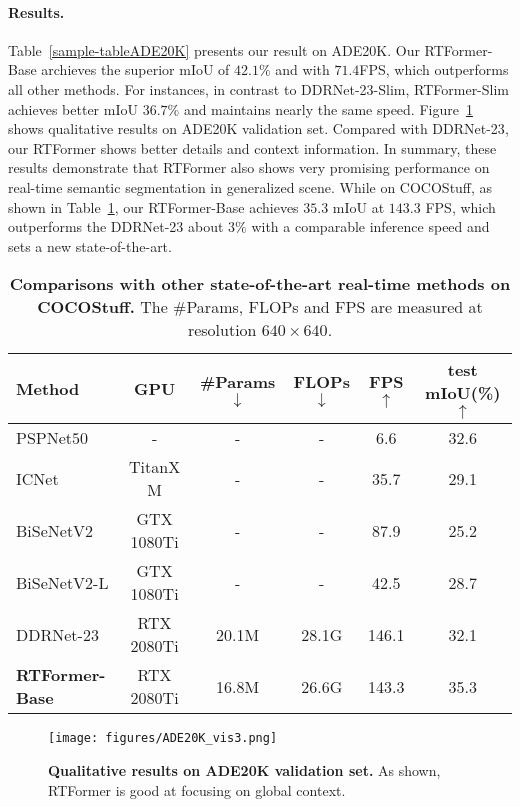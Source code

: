 \documentclass{article}
\begin{document}
\paragraph{Results.}
Table~\ref{sample-tableADE20K} presents our result on ADE20K\cite{ADE20K}. Our RTFormer-Base archieves the superior mIoU of $42.1\%$ and with $71.4$FPS, which outperforms all other methods. For instances, in contrast to DDRNet-23-Slim\cite{hong2021deep}, RTFormer-Slim achieves better mIoU $36.7\%$ and maintains nearly the same speed. Figure~\ref{fig:vis_ade} shows qualitative results on ADE20K validation set. Compared with DDRNet-23\cite{hong2021deep}, our RTFormer shows better details and context information. In summary, these results demonstrate that RTFormer also shows very promising performance on real-time semantic segmentation in generalized scene. While on COCOStuff, as shown in Table~\ref{sample-tableCOCOStuff}, our RTFormer-Base achieves $35.3$ mIoU at $143.3$ FPS, which outperforms the DDRNet-23 about $3\%$ with a comparable inference speed and sets a new state-of-the-art.

\begin{table}
  \caption{\textbf{Comparisons with other state-of-the-art real-time methods on
COCOStuff.} The \#Params, FLOPs and FPS are measured at resolution $640\times640$.}
  \centering
  \begin{tabular}{l|c|c|c|c|c}
    \toprule
Method 
& GPU
    & \#Params$\downarrow$
    & FLOPs$\downarrow$ &FPS$\uparrow$ &test mIoU(\%)$\uparrow$\\
    \midrule
    PSPNet$50$\cite{zhao2017pyramid}
    & -
    & - & - & 6.6 & 32.6 \\
    ICNet\cite{Zhao_2018_ECCV}
    & TitanX M
    & - & - & 35.7 & 29.1 \\
    BiSeNetV2\cite{yu2021bisenet}
    & GTX 1080Ti
    & - & - & 87.9 & 25.2 \\
    BiSeNetV2-L\cite{yu2021bisenet}
    & GTX 1080Ti
    & - & - & 42.5 & 28.7 \\
    \midrule
    DDRNet-23 
    & RTX 2080Ti
    & 20.1M & 28.1G & 146.1 & 32.1 \\
    \midrule
    \textbf{RTFormer-Base}
    & RTX 2080Ti
    & 16.8M & 26.6G & 143.3 & 35.3 \\
    \bottomrule
\end{tabular}
  \label{sample-tableCOCOStuff}
\end{table}

\begin{figure}
    \centering
    \texttt{[image: figures/ADE20K\_vis3.png]}
    \caption{\textbf{Qualitative results on ADE20K\cite{ADE20K} validation set.} As shown, RTFormer is good at focusing on global context.}
    \label{fig:vis_ade}
\end{figure}
\end{document}
